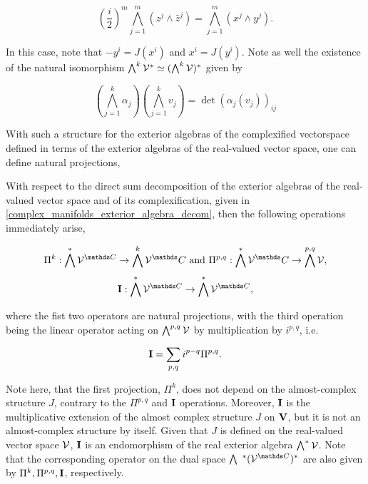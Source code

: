 \[
    \left(\frac{i}{2}\right)^m \bigwedge_{j = 1}^{m} (z^j \land \bar{z}^j) = \bigwedge_{j=1}^{m} (x^j \land y^j).
\]

In this case, note that $ -y^i = J(x^i)$ and $x^i = J(y^i)$. 
Note as well the existence of the natural isomorphism $\bigwedge^{k} \mathcal{V}^* \simeq (\bigwedge^{k} \mathcal{V})^{*}$ given by 

\[
    (\bigwedge_{j=1}^{k} \alpha_j) (\bigwedge_{j=1}^{k} v_j) = \det (\alpha_j(v_j))_{ij}
\]

\blanky \medbreak

With such a structure for the exterior algebras of the complexified vectorspace defined in terms of the exterior algebras of the real-valued vector space, one can define natural projections, 

\begin{df}
    With respect to the direct sum decomposition of the exterior algebras of the real-valued vector space and of its complexification, given in \cref{complex_manifolds_exterior_algebra_decom}, 
    then the following operations immediately arise,

    \begin{equation*}
        \Pi^{k}: \bigwedge^{*} \vectorspace^{\C} \rightarrow \bigwedge^{k} \vectorspace^\C \textnormal{  and  } \Pi^{p,q}: \bigwedge^{*} \vectorspace^\C \rightarrow \bigwedge^{p,q} \vectorspace,
    \end{equation*}
    \begin{equation*}
        {\bf I}: \bigwedge^{*} \vectorspace^{\C} \rightarrow \bigwedge^{*} \vectorspace^{\C},   
    \end{equation*}

    where the fist two operators are natural projections, with the third operation being the linear operator acting on $\bigwedge^{p,q} \mathcal{V}$ by multiplication by $i^{p,q}$, i.e.

    \[
        {\bf I} = \sum_{p,q} i^{p-q} \Pi^{p,q}.
    \]
    
\end{df}

\begin{remark}
\end{remark}

Note here, that the first projection, $\Pi^{k}$, does not depend on the almost-complex structure $J$, contrary to the ${\Pi^{p,q}}$ and ${\bf I}$ operations. 
Moreover, ${\bf I}$ is the multiplicative extension of the almost complex structure $J$ on ${\bf V}$, but it is not an almost-complex structure by itself. 
Given that $J$ is defined on the real-valued vector space $\mathcal{V}$, ${\bf I}$ is an endomorphism of the real exterior algebra $\bigwedge^{*} \mathcal{V}$. 
Note that the corresponding operator on the dual space $\bigwedge \blanky^{*} (\vectorspace^{\C})^{*}$ are also given by $\Pi^k, \Pi^{p,q}, {\bf I}$, respectively. \medbreak

